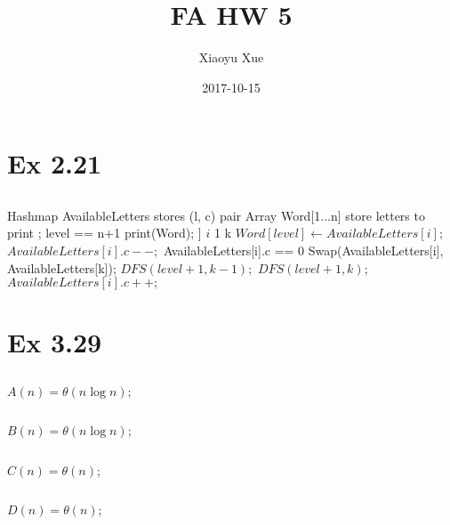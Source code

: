 

\title{FA HW 5}
\date{2017-10-15}
\author{Xiaoyu Xue}

\renewcommand{\thesubsection}{\thesection.\alph{subsection}}
\renewcommand{\thesection}{\arabic{section}}


\maketitle

\section{Ex 2.21}
\subsection{}
\Prog\qq
\Global Hashmap AvailableLetters stores (l, c) pair\qq
\Global Array Word[1...n] store letters to print\qq
{}; \p
\If level == n+1 \Then\p
print(Word);\p
\Endif]\p
\Foreach $i$ 1 \To k \Do \p
$Word[level] \leftarrow AvailableLetters[i];$\p
$AvailableLetters[i].c--;$\p
\If AvailableLetters[i].c == 0 \Then\p
Swap(AvailableLetters[i], AvailableLetters[k]);\p
$DFS(level+1, k-1);$\p
\Else\p
$DFS(level+1, k)$;\p
\Endif\p
$AvailableLetters[i].c++;$\p
\Endfor\qq
\Fini 

 
 \section{Ex 3.29}
 \subsection{}
$A(n) = \theta{(n \log{n})};$
 \subsection{}
 $B(n) = \theta{(n \log{n})};$
 \subsection{}
 $C(n) = \theta{(n)};$
 
  \subsection{}
 $D(n) = \theta{(n)};$
 
